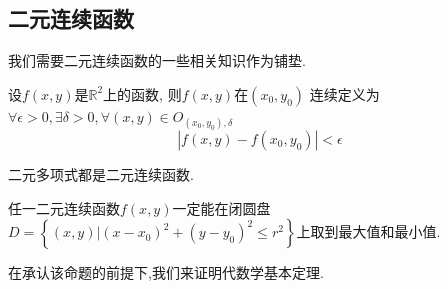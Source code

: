 \subsection{二元连续函数}
我们需要二元连续函数的一些相关知识作为铺垫.
\begin{formal}
\begin{definition}[连续]\label{def:连续}
    设$f\left(x,y\right)$是$\mathbb{R}^2$上的函数,
    则$f\left(x,y\right)$在$\left(x_0,y_0\right)$
    连续定义为$\forall \epsilon >0,\exists \delta >0,\forall \left(x,y\right)\in O_{\left(x_0,y_0\right),\delta}$
    \[
    \left|f\left(x,y\right)-f\left(x_0,y_0\right)\right|<\epsilon
    \]
\end{definition}
\end{formal}
\begin{formal}
\begin{theorem}[二元多项式连续性]\label{thm:二元多项式连续性}
    二元多项式都是二元连续函数.
\end{theorem}
\end{formal}
\begin{formal}
\begin{proposition}[二元连续函数的性质]\label{prop:二元连续函数的性质}
    任一二元连续函数$f\left(x,y\right)$一定能在闭圆盘$D=\left\{
        \left(x,y\right)\big|\left(x-
        x_0\right)^2+\left(y-y_0\right)^2\leqslant r^2
    \right\}$上取到最大值和最小值.
\end{proposition}
\end{formal}
在承认该命题的前提下,我们来证明代数学基本定理.
